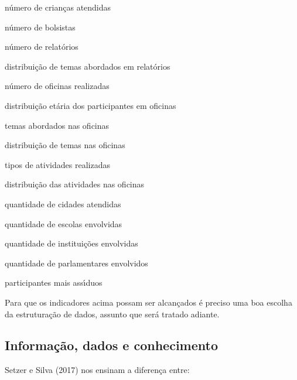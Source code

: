 \documentclass[
12pt,		%
openright,	%
twoside,  %
a4paper,			%
chapter=TITLE,		%
english,			%
french,				%
spanish,			%
brazil				%
]{USPSC-classe/USPSC}
\begin{document}
\begin{alineas}
\item n\'umero de crian\c{c}as atendidas
\item n\'umero de bolsistas
\item n\'umero de relat\'orios
\item distribui\c{c}\~ao de temas abordados em relat\'orios
\item n\'umero de oficinas realizadas
\item distribui\c{c}\~ao et\'aria dos participantes em oficinas
\item temas abordados nas oficinas
\item distribui\c{c}\~ao de temas nas oficinas
\item tipos de atividades realizadas
\item distribui\c{c}\~ao das atividades nas oficinas
\item quantidade de cidades atendidas
\item quantidade de escolas envolvidas
\item quantidade de institui\c{c}\~oes envolvidas
\item quantidade de parlamentares envolvidos
\item participantes mais ass\'{\i}duos
\end{alineas}

Para que os indicadores acima possam ser alcan\c{c}ados \'e preciso uma boa escolha da estrutura\c{c}\~ao de dados, assunto que ser\'a tratado adiante.

















\subsection[Informa\c{c}\~ao, dados e conhecimento]{Informa\c{c}\~ao, dados e conhecimento}\label{Informa\c{c}\~ao, dados e conhecimento}
 Setzer e Silva (2017)  nos ensinam a diferen\c{c}a entre:
\end{document}
